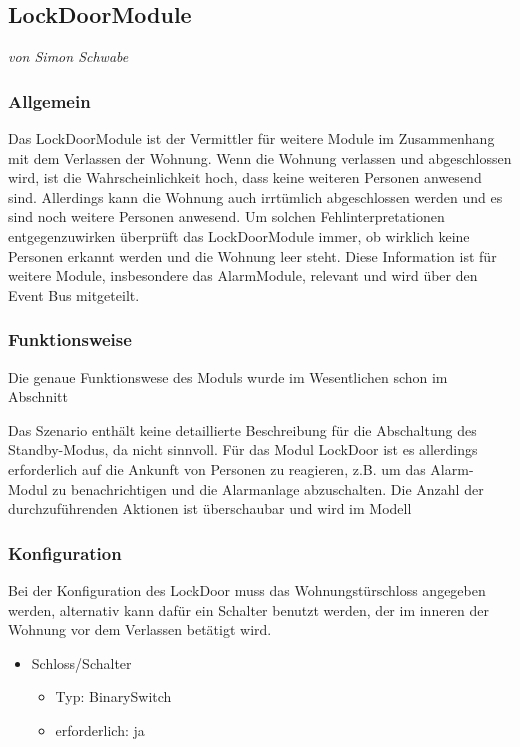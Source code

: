 \subsection{LockDoorModule}
\emph{von Simon Schwabe}

\subsubsection{Allgemein}
Das LockDoorModule ist der Vermittler für weitere Module im Zusammenhang mit dem Verlassen der Wohnung. Wenn die Wohnung verlassen und abgeschlossen wird, ist die Wahrscheinlichkeit hoch, dass keine weiteren Personen anwesend sind. Allerdings kann die Wohnung auch irrtümlich abgeschlossen werden und es sind noch weitere Personen anwesend. Um solchen Fehlinterpretationen entgegenzuwirken überprüft das LockDoorModule immer, ob wirklich keine Personen erkannt werden und die Wohnung leer steht. Diese Information ist für weitere Module, insbesondere das AlarmModule, relevant und wird über den Event Bus mitgeteilt.

\subsubsection{Funktionsweise}
Die genaue Funktionswese des Moduls wurde im Wesentlichen schon im Abschnitt %

Das Szenario enthält keine detaillierte Beschreibung für die Abschaltung des Standby-Modus, da nicht sinnvoll. Für das Modul LockDoor ist es allerdings erforderlich auf die Ankunft von Personen zu reagieren, z.B. um das Alarm-Modul zu benachrichtigen und die Alarmanlage abzuschalten. Die Anzahl der durchzuführenden Aktionen ist überschaubar und wird im Modell %


\subsubsection{Konfiguration}
Bei der Konfiguration des LockDoor muss das Wohnungstürschloss angegeben werden, alternativ kann dafür ein Schalter benutzt werden, der im inneren der Wohnung vor dem Verlassen betätigt wird. 
\begin{itemize}
	\item Schloss/Schalter
	\begin{itemize}
		\item Typ: BinarySwitch
		\item erforderlich: ja
	\end{itemize}
\end{itemize}

